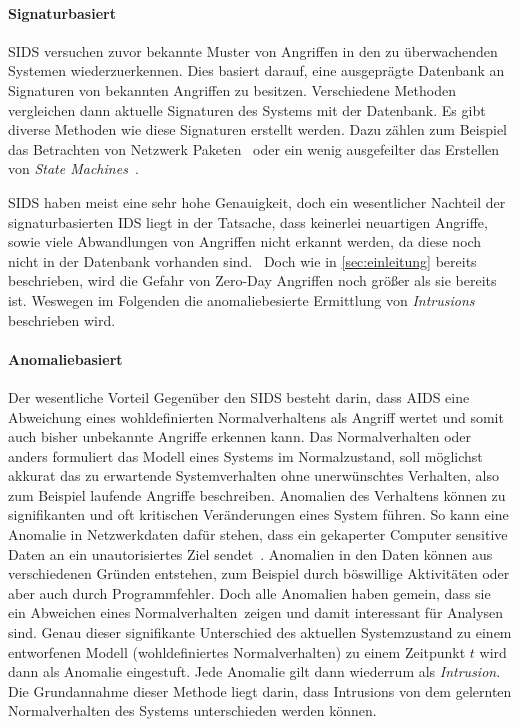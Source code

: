             \paragraph{Signaturbasiert} 
                \ac{SIDS} versuchen zuvor bekannte Muster von Angriffen 
                in den zu überwachenden Systemen wiederzuerkennen.
                Dies basiert darauf, eine ausgeprägte Datenbank an Signaturen von bekannten Angriffen zu besitzen.
                Verschiedene Methoden vergleichen dann aktuelle Signaturen des Systems mit der Datenbank.
                Es gibt diverse Methoden wie diese Signaturen erstellt werden. 
                Dazu zählen zum Beispiel das Betrachten von Netzwerk Paketen~\cite{IDSsurvey}
                oder ein wenig ausgefeilter das Erstellen von \textit{State Machines}~\cite{SIDSstate}.

                \ac{SIDS} haben meist eine sehr hohe Genauigkeit, doch ein wesentlicher Nachteil der signaturbasierten IDS liegt in der Tatsache,
                dass keinerlei neuartigen Angriffe, sowie viele Abwandlungen von Angriffen nicht erkannt werden,
                da diese noch nicht in der Datenbank vorhanden sind.~\cite{IDSsurvey}
                Doch wie in \autoref{sec:einleitung} bereits beschrieben, wird die Gefahr von Zero-Day Angriffen noch größer als sie bereits ist.
                Weswegen im Folgenden die anomaliebesierte Ermittlung von \textit{Intrusions} beschrieben wird.

            \paragraph{Anomaliebasiert}
                Der wesentliche Vorteil Gegenüber den \ac{SIDS} besteht darin, dass \ac{AIDS} eine Abweichung eines wohldefinierten Normalverhaltens als Angriff wertet und somit auch bisher unbekannte Angriffe erkennen kann.
                Das Normalverhalten oder anders formuliert das Modell eines Systems im Normalzustand, soll möglichst akkurat das zu erwartende Systemverhalten ohne unerwünschtes Verhalten, also zum Beispiel laufende Angriffe beschreiben.
                Anomalien des Verhaltens können zu signifikanten und oft kritischen Veränderungen eines System führen. 
                So kann eine Anomalie in Netzwerkdaten dafür stehen,
                dass ein gekaperter Computer sensitive Daten an ein unautorisiertes Ziel sendet~\cite{ANOMALYEXAMPLE}.
                Anomalien in den Daten können aus verschiedenen Gründen entstehen,
                zum Beispiel durch böswillige Aktivitäten oder aber auch durch Programmfehler.
                Doch alle Anomalien haben gemein,
                dass sie ein Abweichen eines \glqq Normalverhalten\grqq\ zeigen und damit interessant für Analysen sind.
                Genau dieser signifikante Unterschied des aktuellen Systemzustand zu einem entworfenen Modell
                (wohldefiniertes Normalverhalten) zu einem Zeitpunkt $t$ wird dann als Anomalie eingestuft.
                Jede Anomalie gilt dann wiederrum als \textit{Intrusion}.
                Die Grundannahme dieser Methode liegt darin, dass Intrusions von dem gelernten Normalverhalten des Systems unterschieden werden können.


